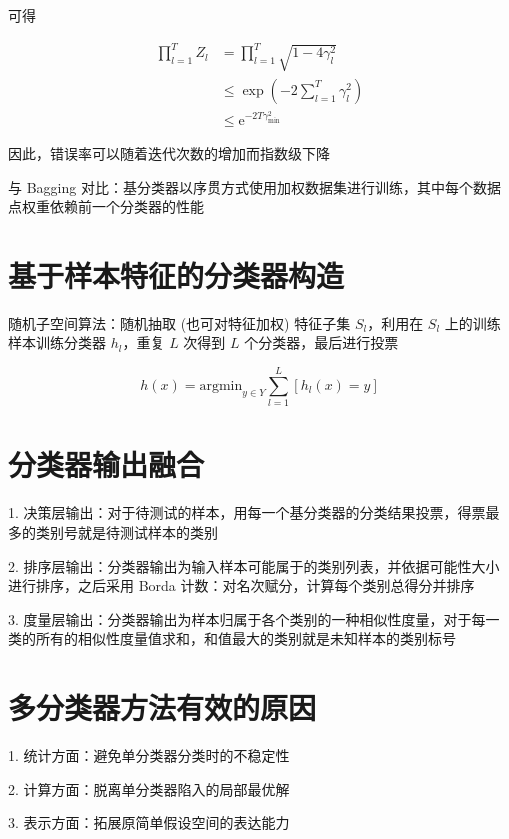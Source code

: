 \documentclass[openany,a4paper,12pt]{ctexbook}
\theoremstyle{kaiti}
\theoremstyle{normal}
\begin{document}
可得

\begin{equation}
\begin{aligned}
  \prod_{l=1}^{T}Z_l
  &=\prod_{l=1}^{T}\sqrt{1-4\gamma_{l}^{2}}\\
  &\leqslant \exp \left(-2\sum_{l=1}^{T}\gamma_{l}^{2} \right)\\
  &\leqslant \mathrm{e}^{-2T\gamma_{\min}^{2}}
\end{aligned}
\end{equation}

因此，错误率可以随着迭代次数的增加而指数级下降

与 Bagging 对比：基分类器以序贯方式使用加权数据集进行训练，其中每个数据点权重依赖前一个分类器的性能

\section{基于样本特征的分类器构造}

随机子空间算法：随机抽取 (也可对特征加权) 特征子集 $S_l$，利用在 $S_l$ 上的训练样本训练分类器 $h_l$，重复 $L$ 次得到 $L$ 个分类器，最后进行投票

\begin{equation}
h(x)=\mathrm{argmin}_{y\in Y}\sum_{l=1}^{L}\left[h_l(x)=y \right]
\end{equation}

\section{分类器输出融合}

1. 决策层输出：对于待测试的样本，用每一个基分类器的分类结果投票，得票最多的类别号就是待测试样本的类别

2. 排序层输出：分类器输出为输入样本可能属于的类别列表，并依据可能性大小进行排序，之后采用 Borda 计数：对名次赋分，计算每个类别总得分并排序

3. 度量层输出：分类器输出为样本归属于各个类别的一种相似性度量，对于每一类的所有的相似性度量值求和，和值最大的类别就是未知样本的类别标号

\section{多分类器方法有效的原因}

1. 统计方面：避免单分类器分类时的不稳定性

2. 计算方面：脱离单分类器陷入的局部最优解

3. 表示方面：拓展原简单假设空间的表达能力
\end{document}
